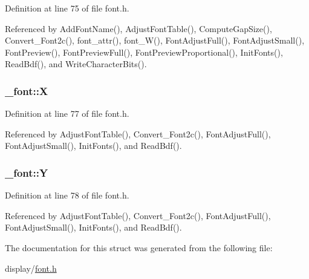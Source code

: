 Definition at line 75 of file font.\+h.



Referenced by Add\+Font\+Name(), Adjust\+Font\+Table(), Compute\+Gap\+Size(), Convert\+\_\+\+Font2c(), font\+\_\+attr(), font\+\_\+\+W(), Font\+Adjust\+Full(), Font\+Adjust\+Small(), Font\+Preview(), Font\+Preview\+Full(), Font\+Preview\+Proportional(), Init\+Fonts(), Read\+Bdf(), and Write\+Character\+Bits().

\subsubsection[{\texorpdfstring{X}{X}}]{ \+\_\+font\+::X}\hypertarget{struct__font_a64a08fdbdaa19418a9b7a34a2db33150}{}\label{struct__font_a64a08fdbdaa19418a9b7a34a2db33150}


Definition at line 77 of file font.\+h.



Referenced by Adjust\+Font\+Table(), Convert\+\_\+\+Font2c(), Font\+Adjust\+Full(), Font\+Adjust\+Small(), Init\+Fonts(), and Read\+Bdf().

\subsubsection[{\texorpdfstring{Y}{Y}}]{ \+\_\+font\+::Y}\hypertarget{struct__font_a3c9fee9cfcc713b1aac812c14dd9a36a}{}\label{struct__font_a3c9fee9cfcc713b1aac812c14dd9a36a}


Definition at line 78 of file font.\+h.



Referenced by Adjust\+Font\+Table(), Convert\+\_\+\+Font2c(), Font\+Adjust\+Full(), Font\+Adjust\+Small(), Init\+Fonts(), and Read\+Bdf().



The documentation for this struct was generated from the following file\+:\begin{DoxyCompactItemize}
\item 
display/\hyperlink{display_2font_8h}{font.\+h}\end{DoxyCompactItemize}
